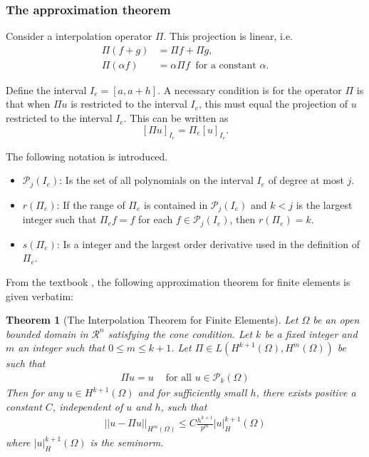 \documentclass[../../main.tex]{subfiles}
\begin{document}
\subsubsection{The approximation theorem}

Consider a interpolation operator $\Pi$.\label{sym:interpolation} This projection is linear, i.e.
\begin{align*}
	\Pi(f + g) & = \Pi f + \Pi g,\\
	\Pi(\alpha f) & = \alpha \Pi f \ \text{ for a constant } \alpha. 
\end{align*}

Define the interval $I_e = [a, a+h]$. A necessary condition is for the operator $\Pi$ is that when $\Pi u$ is restricted to the interval $I_e$, this must equal the projection of $u$ restricted to the interval $I_e$. This can be written as
\begin{equation*}
	\left[ \Pi u \right]_{I_{e}} = \Pi_e [u]_{I_{e}}.
\end{equation*}

The following notation is introduced.
\begin{itemize}
	\item[] $\mathcal{P}_j(I_e)$: Is the set of all polynomials on the interval $I_e$ of degree at most $j$. \label{sym:poly}
	\item[] $r(\Pi_e)$: If the range of $\Pi_e$ is contained in $\mathcal{P}_j(I_e)$ and $k<j$ is the largest integer such that $\Pi_e f = f$ for each $f \in \mathcal{P}_j(I_e)$, then $r(\Pi_e) = k$.
	\item[] $s(\Pi_e)$: Is a integer and the largest order derivative used in the definition of $\Pi_e$.
\end{itemize}

From the textbook \cite{ORXX}, the following approximation theorem for finite elements is given verbatim:
\newtheorem*{Interpolation}{Theorem}
\begin{Interpolation}[The Interpolation Theorem for Finite Elements] 
	Let $\Omega$ be an open bounded domain in $\mathcal{R}^n$ satisfying the cone condition. Let $k$ be a fixed integer and $m$ an integer such that $0\leq m \leq k+1$. Let $\Pi \in L(H^{k+1}(\Omega), H^{m}(\Omega))$ be such that
	\begin{eqnarray}
	    \Pi u = u \ \ \ \ \textrm{ for all } u \in \mathcal{P}_k(\Omega)
	\end{eqnarray}
	Then for any $u \in H^{k+1}(\Omega)$ and for sufficiently small $h$, there exists positive a constant $C$, independent of $u$ and $h$, such that
	\begin{eqnarray}
	    ||u - \Pi u||_{H^m(\Omega)} \leq C \frac{h^{k+1}}{p^m} |u|_H^{k+1}(\Omega)
	\end{eqnarray}
	where $|u|_H^{k+1}(\Omega)$ is the seminorm.
\end{Interpolation}
\end{document}
